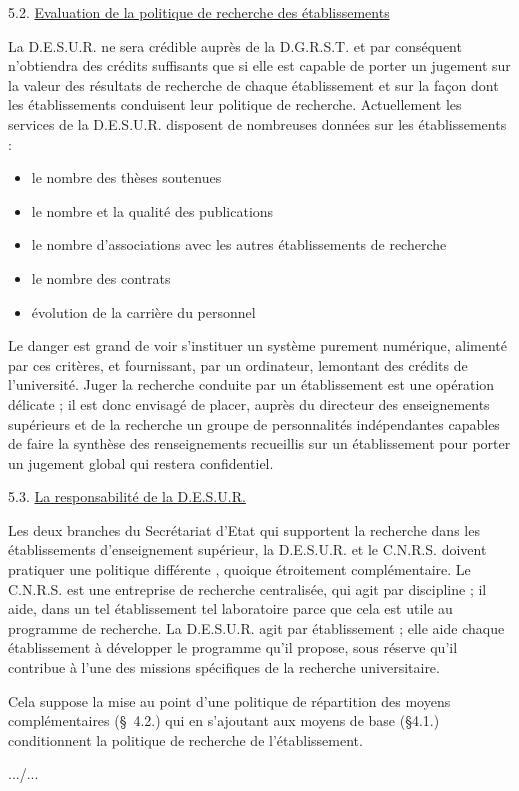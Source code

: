 5.2. \uline{Evaluation de la politique de recherche des établissements}

La D.E.S.U.R. ne sera crédible auprès de la D.G.R.S.T.
et par conséquent n'obtiendra des crédits suffisants que si elle est capable de
porter un jugement sur la valeur des résultats de recherche de chaque établissement
et sur la façon dont les établissements conduisent leur politique de recherche.
Actuellement les services de la D.E.S.U.R. disposent de nombreuses données sur les
établissements :

\begin{itemize}[label={-}]
\item le nombre des thèses soutenues
\item le nombre et la qualité des publications
\item le nombre d'associations avec les autres établissements de recherche
\item le nombre des contrats
\item évolution de la carrière du personnel
\end{itemize}

Le danger est grand de voir s'instituer un système purement
numérique, alimenté par ces critères, et fournissant, par un ordinateur, le\unsure{:|;}montant
des crédits de l'université. Juger la recherche conduite par un établissement est
une opération délicate ; il est donc envisagé de placer, auprès du directeur des
enseignements supérieurs et de la recherche un groupe de personnalités indépendantes
capables de faire la synthèse des renseignements recueillis sur un établissement
pour porter un jugement global qui restera confidentiel.

5.3. \uline{La responsabilité de la D.E.S.U.R.}

Les deux branches du Secrétariat d'Etat qui supportent la
recherche dans les établissements d'enseignement supérieur, la D.E.S.U.R. et le
C.N.R.S. doivent pratiquer une politique différente , quoique étroitement complémentaire. Le C.N.R.S. est une entreprise de recherche centralisée, qui agit par
discipline ; il aide, dans un tel établissement tel laboratoire parce que cela est
utile au programme de recherche. La D.E.S.U.R. agit par établissement ; elle aide
chaque établissement à développer le programme qu'il propose, sous réserve qu'il
contribue à l'une des missions spécifiques de la recherche universitaire.

Cela suppose la mise au point d'une politique de répartition
des moyens complémentaires (\S\ 4.2.) qui en s'ajoutant aux moyens de base (\S4.1.)
conditionnent la politique de recherche de l'établissement.

\hfill .../...

